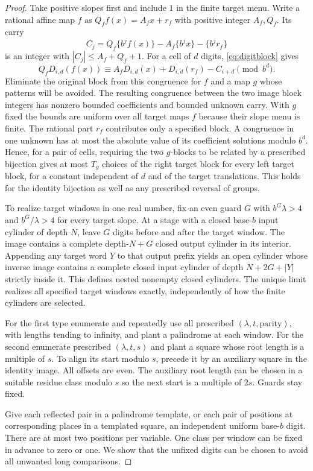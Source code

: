 \begin{proof}
Take positive slopes first and include $1$ in the finite target menu. Write a rational affine map $f$ as $Q_f f(x)=A_f x+r_f$ with positive integer $A_f,Q_f$. Its carry
\[
 C_j=Q_f\{b^jf(x)\}-A_f\{b^jx\}-\{b^jr_f\}
\]
is an integer with $|C_j|\le A_f+Q_f+1$. For a cell of $d$ digits, \eqref{eq:digitblock} gives
\[
 Q_fD_{i,d}(f(x))\equiv A_fD_{i,d}(x)+D_{i,d}(r_f)-C_{i+d}\pmod{b^d}.
\]
Eliminate the original block from this congruence for $f$ and a map $g$ whose patterns will be avoided. The resulting congruence between the two image block integers has nonzero bounded coefficients and bounded unknown carry. With $g$ fixed the bounds are uniform over all target maps $f$ because their slope menu is finite. The rational part $r_f$ contributes only a specified block. A congruence in one unknown has at most the absolute value of its coefficient solutions modulo $b^d$. Hence, for a pair of cells, requiring the two $g$-blocks to be related by a prescribed bijection gives at most $T_g$ choices of the right target block for every left target block, for a constant independent of $d$ and of the target translations. This holds for the identity bijection as well as any prescribed reversal of groups.

To realize target windows in one real number, fix an even guard $G$ with $b^G\lambda>4$ and $b^G/\lambda>4$ for every target slope. At a stage with a closed base-$b$ input cylinder of depth $N$, leave $G$ digits before and after the target window. The image contains a complete depth-$N+G$ closed output cylinder in its interior. Appending any target word $Y$ to that output prefix yields an open cylinder whose inverse image contains a complete closed input cylinder of depth $N+2G+|Y|$ strictly inside it. This defines nested nonempty closed cylinders. The unique limit realizes all specified target windows exactly, independently of how the finite cylinders are selected.

For the first type enumerate and repeatedly use all prescribed $(\lambda,t,\text{parity})$, with lengths tending to infinity, and plant a palindrome at each window. For the second enumerate prescribed $(\lambda,t,s)$ and plant a square whose root length is a multiple of $s$. To align its start modulo $s$, precede it by an auxiliary square in the identity image. All offsets are even. The auxiliary root length can be chosen in a suitable residue class modulo $s$ so the next start is a multiple of $2s$. Guards stay fixed.

Give each reflected pair in a palindrome template, or each pair of positions at corresponding places in a templated square, an independent uniform base-$b$ digit. There are at most two positions per variable. One class per window can be fixed in advance to zero or one. We show that the unfixed digits can be chosen to avoid all unwanted long comparisons.


\end{proof}
